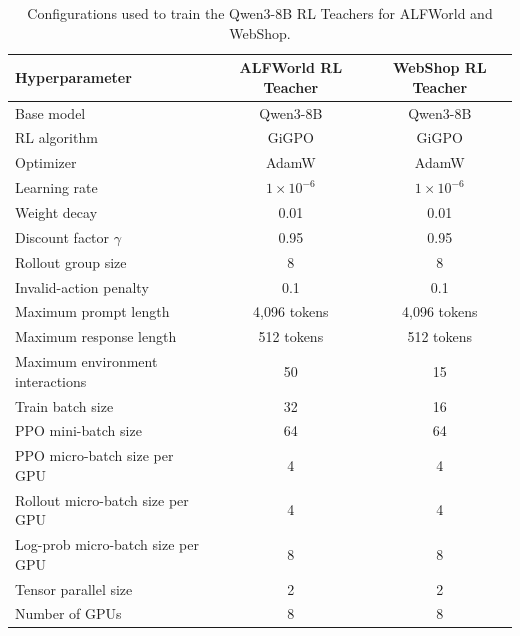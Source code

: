 \begin{table}[t]
\centering
\small
\setlength{\tabcolsep}{5.0pt}
\begin{tabular}{lcc}
\toprule
\textbf{Hyperparameter}
&
\textbf{ALFWorld RL Teacher}
&
\textbf{WebShop RL Teacher}
\\
\midrule
Base model
& Qwen3-8B
& Qwen3-8B
\\
RL algorithm
& GiGPO
& GiGPO
\\
Optimizer
& AdamW
& AdamW
\\
Learning rate
& $1\times10^{-6}$
& $1\times10^{-6}$
\\
Weight decay
& 0.01
& 0.01
\\
Discount factor $\gamma$
& 0.95
& 0.95
\\
Rollout group size
& 8
& 8
\\
Invalid-action penalty
& 0.1
& 0.1
\\
Maximum prompt length
& 4,096 tokens
& 4,096 tokens
\\
Maximum response length
& 512 tokens
& 512 tokens
\\
Maximum environment interactions
& 50
& 15
\\
Train batch size
& 32
& 16
\\
PPO mini-batch size
& 64
& 64
\\
PPO micro-batch size per GPU
& 4
& 4
\\
Rollout micro-batch size per GPU
& 4
& 4
\\
Log-prob micro-batch size per GPU
& 8
& 8
\\
Tensor parallel size
& 2
& 2
\\
Number of GPUs
& 8
& 8
\\
\bottomrule
\end{tabular}
\caption{
Configurations used to train the Qwen3-8B RL Teachers for ALFWorld
and WebShop.
}
\label{tab:rl_teacher_settings}
\end{table}
